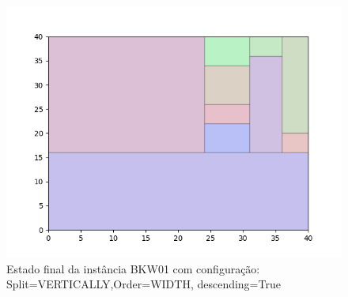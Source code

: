 \begin{figure}[H]
    \centering
    \caption[]{Estado final da instância BKW01 com configuração: Split=VERTICALLY,Order=WIDTH, descending=True}
    \label{fig:bkw01-vertically-width-true}
    \includegraphics[scale=0.5]{output/figures/bkw/bkw01/vertically/width/true/00}
\end{figure}